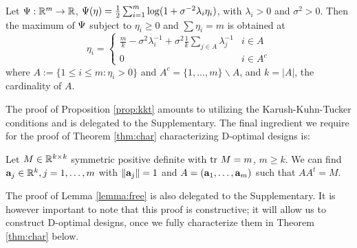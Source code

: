 \begin{proposition}\label{prop:kkt}
  Let $\Psi: \mathbb{R}^m \to \mathbb{R}$, $\Psi(\eta) =
  \frac{1}{2}\sum_{i=1}^m \log (1+\sigma^{-2}\lambda_i \eta_i)$, with
  $\lambda_i > 0$ and $\sigma^{2} > 0$. Then the maximum of $\Psi$
  subject to $\eta_i \geq 0$ and $\sum\eta_i = m$ is obtained at
  \begin{equation}
  \eta_i = \begin{cases}
    \frac{m}{k} - \sigma^2 \lambda_i^{-1} + \sigma^2 \frac{1}{k} \sum_{j\in A} \lambda_j^{-1} & i \in A \\
    0 & i \in A^c
  \end{cases}
  \end{equation}
  where $A:= \{1\leq i \leq m: \eta_i > 0\}$ and $A^c = \{1,\dots, m\}
  \backslash A$, and $k = |A|$, the cardinality of $A$.
\end{proposition}

The proof of Proposition \ref{prop:kkt} amounts to utilizing the
Karush-Kuhn-Tucker conditions and is delegated to the
Supplementary. The final ingredient we require for the proof of
Theorem \ref{thm:char} characterizing D-optimal designs is:


\begin{lemma}\label{lemma:free}
  Let $M \in \mathbb{R}^{k \times k}$ symmetric positive definite with $\textup{tr}\ M
  = m$, $m \geq k$. We can find $\mathbf{a}_j \in \mathbb{R}^k,j=1,\dots,m$
  with $\|\mathbf{a}_j\|=1$ and $A = (\mathbf{a}_1,\dots,\mathbf{a}_m)$ such that
  $AA^t = M$.
\end{lemma}

The proof of Lemma \ref{lemma:free} is also delegated to the
Supplementary. It is however important to note that this proof is
constructive; it will allow us to construct D-optimal designs, once we
fully characterize them in Theorem \ref{thm:char} below.


